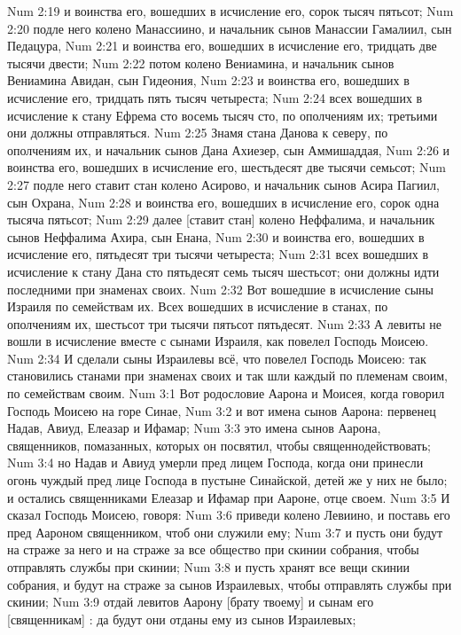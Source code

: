\vs Num 2:19 и воинства его, вошедших в исчисление его, сорок тысяч пятьсот;
\vs Num 2:20 подле него колено Манассиино, и начальник сынов Манассии Гамалиил, сын Педацура,
\vs Num 2:21 и воинства его, вошедших в исчисление его, тридцать две тысячи двести;
\vs Num 2:22 потом колено Вениамина, и начальник сынов Вениамина Авидан, сын Гидеония,
\vs Num 2:23 и воинства его, вошедших в исчисление его, тридцать пять тысяч четыреста;
\vs Num 2:24 всех вошедших в исчисление к стану Ефрема сто восемь тысяч сто, по ополчениям их; третьими они должны отправляться.
\vs Num 2:25 Знамя стана Данова к северу, по ополчениям их, и начальник сынов Дана Ахиезер, сын Аммишаддая,
\vs Num 2:26 и воинства его, вошедших в исчисление его, шестьдесят две тысячи семьсот;
\vs Num 2:27 подле него ставит стан колено Асирово, и начальник сынов Асира Пагиил, сын Охрана,
\vs Num 2:28 и воинства его, вошедших в исчисление его, сорок одна тысяча пятьсот;
\vs Num 2:29 далее [ставит стан] колено Неффалима, и начальник сынов Неффалима Ахира, сын Енана,
\vs Num 2:30 и воинства его, вошедших в исчисление его, пятьдесят три тысячи четыреста;
\vs Num 2:31 всех вошедших в исчисление к стану Дана сто пятьдесят семь тысяч шестьсот; они должны идти последними при знаменах своих.
\vs Num 2:32 Вот вошедшие в исчисление сыны Израиля по семействам их. Всех вошедших в исчисление в станах, по ополчениям их, шестьсот три тысячи пятьсот пятьдесят.
\vs Num 2:33 А левиты не вошли в исчисление вместе с сынами Израиля, как повелел Господь Моисею.
\vs Num 2:34 И сделали сыны Израилевы всё, что повелел Господь Моисею: так становились станами при знаменах своих и так шли каждый по племенам своим, по семействам своим.
\vs Num 3:1 Вот родословие Аарона и Моисея, когда говорил Господь Моисею на горе Синае,
\vs Num 3:2 и вот имена сынов Аарона: первенец Надав, Авиуд, Елеазар и Ифамар;
\vs Num 3:3 это имена сынов Аарона, священников, помазанных, которых он посвятил, чтобы священнодействовать;
\vs Num 3:4 но Надав и Авиуд умерли пред лицем Господа, когда они принесли огонь чуждый пред лице Господа в пустыне Синайской, детей же у них не было; и остались священниками Елеазар и Ифамар при Аароне, отце своем.
\rsbpar\vs Num 3:5 И сказал Господь Моисею, говоря:
\vs Num 3:6 приведи колено Левиино, и поставь его пред Аароном священником, чтоб они служили ему;
\vs Num 3:7 и пусть они будут на страже за него и на страже за все общество при скинии собрания, чтобы отправлять службы при скинии;
\vs Num 3:8 и пусть хранят все вещи скинии собрания, и будут на страже за сынов Израилевых, чтобы отправлять службы при скинии;
\vs Num 3:9 отдай левитов Аарону [брату твоему] и сынам его [священникам] : да будут они отданы ему из сынов Израилевых;
